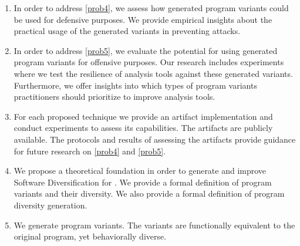 \begin{enumerate}[label=\textbf{C\arabic*}, ref=C\arabic*]

	\item \label{defensivecontrib}  In order to address \ref{prob4}, we assess how generated \Wasm program variants could be used for defensive purposes. We provide empirical insights about the practical usage of the generated variants in preventing attacks.
	
	\item \label{ofensivecontrib}  
	In order to address \ref{prob5}, we evaluate the potential for using generated \Wasm program variants for offensive purposes. 
	Our research includes experiments where we test the resilience of \Wasm analysis tools against these generated variants. 
	Furthermore, we offer insights into which types of program variants practitioners should prioritize to improve \Wasm analysis tools.

	\item \label{methodcontrib}  For each proposed technique we provide an artifact implementation and conduct experiments to assess its capabilities. The artifacts are publicly available. The protocols and results of assessing the artifacts provide guidance for future research on \ref{prob4} and \ref{prob5}.
	
	\item \label{therycontrib}  We propose a theoretical foundation in order to generate and improve Software Diversification for \Wasm. We provide a formal definition of \Wasm program variants and their diversity. We also provide a formal definition of \Wasm program diversity generation.
	
	\item \label{generationcontrib}  We generate \Wasm program variants. The variants are functionally equivalent to the original program, yet behaviorally diverse.
	

	
\end{enumerate}

